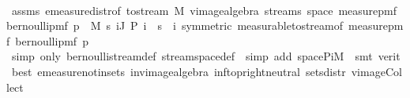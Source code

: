 \begin{isabellebody}
\ \ \ \ \isamarkupfalse%
\ assms\ emeasure{\isacharunderscore}{\kern0pt}distr{\isacharbrackleft}{\kern0pt}of\ {\isachardoublequoteopen}to{\isacharunderscore}{\kern0pt}stream{\isachardoublequoteclose}\ {\isacharquery}{\kern0pt}M\ {\isachardoublequoteopen}{\isacharparenleft}{\kern0pt}vimage{\isacharunderscore}{\kern0pt}algebra\ {\isacharparenleft}{\kern0pt}streams\ {\isacharparenleft}{\kern0pt}space\ {\isacharparenleft}{\kern0pt}measure{\isacharunderscore}{\kern0pt}pmf\ {\isacharparenleft}{\kern0pt}bernoulli{\isacharunderscore}{\kern0pt}pmf\ p{\isacharparenright}{\kern0pt}{\isacharparenright}{\kern0pt}{\isacharparenright}{\kern0pt}{\isacharparenright}{\kern0pt}\ {\isacharparenleft}{\kern0pt}{\isacharbang}{\kern0pt}{\isacharbang}{\kern0pt}{\isacharparenright}{\kern0pt}\ {\isacharquery}{\kern0pt}M{\isacharparenright}{\kern0pt}{\isachardoublequoteclose}\ {\isachardoublequoteopen}{\isacharbraceleft}{\kern0pt}s{\isachardot}{\kern0pt}\ {\isasymforall}i{\isasymin}J{\isachardot}{\kern0pt}\ P\ i\ {\isacharequal}{\kern0pt}\ s\ {\isacharbang}{\kern0pt}{\isacharbang}{\kern0pt}\ i{\isacharbraceright}{\kern0pt}{\isachardoublequoteclose}{\isacharcomma}{\kern0pt}\ symmetric{\isacharbrackright}{\kern0pt}\ measurable{\isacharunderscore}{\kern0pt}to{\isacharunderscore}{\kern0pt}stream{\isacharbrackleft}{\kern0pt}of\ {\isachardoublequoteopen}{\isacharparenleft}{\kern0pt}measure{\isacharunderscore}{\kern0pt}pmf\ {\isacharparenleft}{\kern0pt}bernoulli{\isacharunderscore}{\kern0pt}pmf\ p{\isacharparenright}{\kern0pt}{\isacharparenright}{\kern0pt}{\isachardoublequoteclose}{\isacharbrackright}{\kern0pt}\isanewline
\ \ \ \ \isamarkupfalse%
\ {\isacharparenleft}{\kern0pt}simp\ only{\isacharcolon}{\kern0pt}\ bernoulli{\isacharunderscore}{\kern0pt}stream{\isacharunderscore}{\kern0pt}def\ stream{\isacharunderscore}{\kern0pt}space{\isacharunderscore}{\kern0pt}def\ {\isacharasterisk}{\kern0pt}{\isacharcomma}{\kern0pt}\ simp\ add{\isacharcolon}{\kern0pt}\ space{\isacharunderscore}{\kern0pt}PiM\ {\isacharparenright}{\kern0pt}\ {\isacharparenleft}{\kern0pt}smt\ {\isacharparenleft}{\kern0pt}verit{\isacharcomma}{\kern0pt}\ best{\isacharparenright}{\kern0pt}\ emeasure{\isacharunderscore}{\kern0pt}notin{\isacharunderscore}{\kern0pt}sets\ in{\isacharunderscore}{\kern0pt}vimage{\isacharunderscore}{\kern0pt}algebra\ inf{\isacharunderscore}{\kern0pt}top{\isachardot}{\kern0pt}right{\isacharunderscore}{\kern0pt}neutral\ sets{\isacharunderscore}{\kern0pt}distr\ vimage{\isacharunderscore}{\kern0pt}Collect{\isacharparenright}{\kern0pt}\isanewline
\ \ \isamarkupfalse%

\end{isabellebody}
